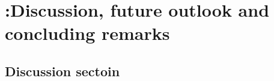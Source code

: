 \chapter[Discussion, future outlook and concluding remarks]{{\color{red} :}Discussion, future outlook and concluding remarks}
\label{ch:discussion}

\noindent \kant[15]


\section{Discussion sectoin}

\kant[16-18]

